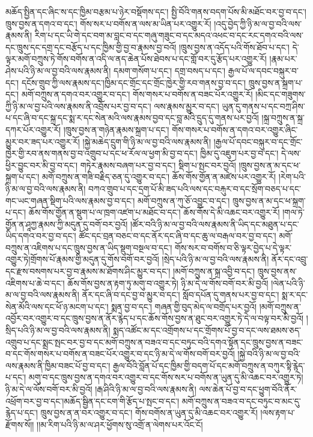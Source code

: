 མཆོད་སྤྱིན་དང་ཞིང་ས་དང་ཁྱིམ་བརྩམ་པ་ཉེར་བསྡོགས་དང་། སྤྱི་བོའི་གནས་བདག་པོས་མི་མཐོང་བར་བྱ་བ་དང་། ཁྲུས་བྱས་ན་དགའ་བ་དང་། གོས་སར་པ་བགོས་ན་ལས་མ་ཡིན་པར་འགྱུར་རོ། །འདུ་བྱེད་ཀྱི་ཉི་མ་ལ་བྱ་བའི་ལས་རྣམས་ནི། རིག་པ་དང་ཡི་གེ་དང་བག་མ་བླང་བ་དང་གཞུ་གཟུང་བ་དང་མདའ་འཕང་བ་དང་རང་དགའ་བའི་ལས་དང་ཁྲུས་དང་དགྲ་དང་བརྩོད་པ་དང་ཁྱིམ་གྱི་བྱ་བ་རྣམས་བྱ་བའོ། །ཁྲུས་བྱས་ན་འདོད་པའི་གོས་ཐོབ་པ་དང་། དེ་ལྟར་མགོ་བཀྲུས་ཏེ་གོས་བགོས་ན་འདི་ལ་ནད་ཆེན་པོས་ཐེབས་པ་དང་གློ་བར་དུ་རྩོད་པར་འགྱུར་རོ། །རྣམ་པར་ཤེས་པའི་ཉི་མ་ལ་བྱ་བའི་ལས་རྣམས་ནི། དམག་གསོག་པ་དང་། དགྲ་བསད་པ་དང་། རྒྱལ་པོ་ལ་དབང་བསྐུར་བ་དང་། དངོས་གྲུབ་ཀྱི་ལས་རྣམས་དང་།ཁྱིམ་དང་གྲོང་དང་གྲོང་ཁྱེར་གྱི་རབ་གནས་བྱ་བ་དང་། ཁྲུས་བྱས་ན་སྐྲག་པ་དང་། མགོ་བཀྲུས་ན་དགའ་བར་འགྱུར་བ་དང་། གོས་གསར་པ་བགོས་ན་བཟང་པོར་འགྱུར་རོ། །མིང་དང་གཟུགས་ཀྱི་ཉི་མ་ལ་བྱ་པའི་ལས་རྣམས་ནི་འབྲོས་པར་བྱ་བ་དང་། ལས་རྣམས་མྱུར་བ་དང་། ཡུན་དུ་གནས་པ་དང་བཀྲ་ཤིས་པ་དང་ཞི་བ་དང་སྐྲ་དང་སྨ་ར་དང་སེན་མའི་ལས་རྣམས་བྱབ་དང་བླ་མའི་དྲུད་དུ་གནས་པར་བྱའོ། །སྐྲ་བཀྲུས་ན་སྐྲ་དཀར་པོར་འགྱུར་རོ། །ཁྲུས་བྱས་ན་གཉེན་རྣམས་སྐྲག་པ་དང་། གོས་གསར་པ་བགོས་ན་དགའ་བར་འགྱུར་ཞིང་མྱུར་བར་ཟད་པར་འགྱུར་རོ། །སྐྱེ་མཆེད་དྲུག་གི་ཉི་མ་ལ་བྱ་བའི་ལས་རྣམས་ནི། །རྒྱལ་པོ་དབང་བསྐུར་བ་དང་གྲོང་ཁྱེར་གྱི་རབ་ནས་གནས་བྱ་བ་འགྲུབ་པ་དང་ཕ་རོལ་ལ་ཕྱག་མི་བྱ་བ་དང་། ཁྱིམ་དུ་འཇུག་པར་བྱ་བ་དང་། དེ་ལས་ཕྱིར་བྱུང་བར་མི་བྱ་བ་དང་། གཏེར་རྣམས་བཞག་པར་བྱ་བ་དང་། སྡིག་པ་སྤང་བར་བྱའོ། །ཁྲུས་བྱས་ན་མ་དང་ཕ་སྐྲག་པ་དང་། མགོ་བཀྲུས་ན་གཟི་བརྗིད་ཅན་དུ་འགྱུར་བ་དང་། ཆོས་གོས་གྱོན་ན་མཛེས་པར་འགྱུར་རོ། །རེག་པའི་ཉི་མ་ལ་བྱ་བའི་ལས་རྣམས་ནི། བཀའ་གྲུབ་པ་དང་དྲག་པོ་མི་ཟད་པའི་ལས་དང་བརྐུར་བ་དང་སྲོག་བཅད་པ་དང་གང་ཡང་གཞན་སྡིག་པའི་ལས་རྣམས་བྱ་བ་དང་། མགོ་བཀྲུས་ན་ཀུ་ཅོ་འབྱུང་བ་དང་། ཁྲུས་བྱས་ན་མ་དང་ཕ་སྐྲག་པ་དང་། ཆོས་གོས་གྱོན་ན་སྡུག་པ་ལ་ཁྲག་འཛག་པ་མཐོང་བ་དང་། ཆོས་གོས་དེ་མི་འཆང་བར་འགྱུར་རོ། །གལ་ཏེ་གྱོན་ན་ཤཱཀྱ་རྣམས་ཀྱི་མདུན་དུ་བགོ་བར་བྱའོ། །ཚོར་བའི་ཉི་མ་ལ་བྱ་བའི་ལས་རྣམས་ནི་ཡིད་དང་མཐུན་པ་དང་ཡིད་དགའ་བར་བྱ་བ་དང་། ཚོང་དང་བྲན་བཅང་བ་དང་ནོར་དང་ཞི་བ་དང་ཆུ་ལ་བརྒལ་བར་བྱ་བ་དང་། མགོ་བཀྲུས་ན་འཇིགས་པ་དང་ཁྲུས་བྱས་ན་ཡིད་སྡུག་བསྔལ་བ་དང་། གོས་སར་བ་བགོས་བ་ཅི་ལྟར་བྱེད་པ་དེ་ལྟར་འགྱུར་ཏེ།གྲོགས་པོ་རྣམས་གྱི་མདུན་དུ་གོས་བགོ་བར་བྱའོ། །སྲེད་པའི་ཉི་མ་ལ་བྱ་བའི་ལས་རྣམས་ནི། ནོར་དང་འབྲུ་དང་རྫས་བསགས་པར་བྱ་བ་རྣམས་མ་ཐོགས་ཤིང་མྱུར་བ་དང་། །མགོ་བཀྲུས་ན་སྐྲ་འབྱི་བ་དང་། ཁྲུས་བྱས་ནས་འཇིགས་པ་ཆེ་བ་དང་། ཆོས་གོས་བྱས་ན་རྟག་ཏུ་མགུ་བ་འགྱུར་ཏེ། ཉི་མ་དེ་ལ་གོས་བགོ་བར་མི་བྱའོ། །ལེན་པའི་ཉི་མ་ལ་བྱ་བའི་ལས་རྣམས་ནི། ནོར་དང་ཞི་བ་དང་བྱ་བ་མྱུར་བ་དང་། སློབ་དཔོན་དུ་གནས་པར་བྱ་བ་དང་། སྨ་ར་དང་སེན་མོའི་ལས་དང་ཕོ་ཉ་མངག་པ་དང་། སྨན་བྱ་བ་དང་། གཞན་གྱི་བུད་མེད་ལ་བགྲོད་པར་བྱའོ། །མགོ་བཀྲུས་ན་འབྱོར་བར་འགྱུར་བ་དང་ཁྲུས་བྱས་ན་ནོར་རྙེད་པ་དང་ཆོས་གོས་བྱས་ན་ཐུང་བར་འགྱུར་ཏེ་དེ་ལ་བལྟ་བར་མི་བྱའོ། །སྲིད་པའི་ཉི་མ་ལ་བྱ་བའི་ལས་རྣམས་ནི། སྨད་འཚོང་མ་དང་འགྲོགས་པ་དང་གྲོགས་པོ་བྱ་བ་དང་ལས་ཐམས་ཅད་འགྲུབ་པ་དང་སྨྲང་སྤང་བར་བྱ་བ་དང་མགོ་བཀྲུས་ན་བཟའ་བ་དང་བཏུང་བའི་དགའ་སྟོན་དང་ཁྲུས་བྱས་ན་བཟང་བ་དང་གོས་གསར་པ་བགོས་ན་བཟང་པོར་འགྱུར་བ་དང་ཉི་མ་དེ་ལ་གོས་བགོ་བར་བྱའོ། །སྐྱེ་བའི་ཉི་མ་ལ་བྱ་བའི་ལས་རྣམས་ནི་ཁྱིམ་བཟང་པོ་བྱ་བ་དང་། རྒྱལ་བོའི་བློན་པོ་དང་ཁྱིམ་གྱི་བདག་པོ་དང་མགོ་བཀྲུས་ན་བཀུར་སྟི་རྙེད་པ་དང་། མགུ་བ་དང་ཁྲུས་བྱས་ན་དགའ་བར་འགྱུར་བ་དང་གོས་སར་པ་བགོས་ན་ཡུན་དུ་མི་འཆང་བར་འགྱུར་ཏེ། ཉི་མ་དེ་ལ་ལོས་བགོ་བར་མི་བྱའོ། །རྒ་ཤིའི་ཉི་མ་ལ་བྱ་བའི་ལས་རྣམས་ནི། ལས་ཆེན་པོ་བྱ་བ་དང་ཕྱུག་བོའི་ནོར་འཕྲོག་བར་བྱ་བ་དང་།མཆོད་སྦྱིན་དང་ངག་གི་རྩོད་པ་སྤང་བ་དང་། མགོ་བཀྲུས་ན་བཟའ་བ་དང་བཏུང་བ་མང་དུ་རྙེད་པ་དང་། ཁྲུས་བྱས་ན་ན་བར་འགྱུར་བ་དང་། གོས་བགོས་ན་ཡུན་དུ་མི་འཆང་བར་འགྱུར་རོ། །ལས་རྟག་པ་རྫོགས་སོ།། །།མ་རིག་པའི་ཉི་མ་ལ་ཤར་ཕྱོགས་སུ་འགྲོ་ན་ལེགས་པར་འོང་ངོ། 